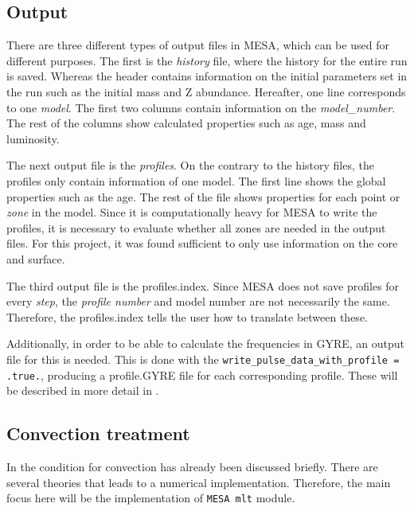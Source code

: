 \subsection{Output}
There are three different types of output files in MESA, which can be used for different purposes. The first is the \textit{history} file, where the history for the entire run is saved. Whereas the header contains information on the initial parameters set in the run such as the initial mass and Z abundance. Hereafter, one line corresponds to one \textit{model}. The first two columns contain information on the \textit{model\_number}. The rest of the columns show calculated properties such as age, mass and luminosity. 

The next output file is the \textit{profiles}. On the contrary to the history files, the profiles only contain information of one model. The first line shows the global properties such as the age. The rest of the file shows properties for each point or \textit{zone} in the model. Since it is computationally heavy for MESA to write the profiles, it is necessary to evaluate whether all zones are needed in the output files. For this project, it was found sufficient to only use information on the core and surface. 

The third output file is the profiles.index. Since MESA does not save profiles for every \textit{step}, the \textit{profile number} and model number are not necessarily the same. Therefore, the profiles.index tells the user how to translate between these.

Additionally, in order to be able to calculate the frequencies in GYRE, an output file for this is needed. This is done with the \texttt{write\_pulse\_data\_with\_profile = .true.}, producing a profile.GYRE file for each corresponding profile. These will be described in more detail in .


\subsection{Convection treatment}
\label{sec:conv_prescriptions}

In  the condition for convection has already been discussed briefly. There are several theories that leads to a numerical implementation.  Therefore, the main focus here will be the implementation of \texttt{MESA mlt} module. 

